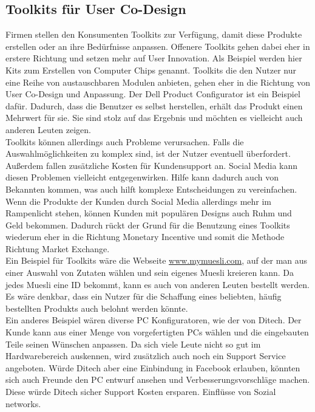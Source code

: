 \subsection{Toolkits f\"ur User Co-Design}
Firmen stellen den Konsumenten Toolkits zur Verf\"ugung, damit diese Produkte erstellen oder an ihre Bed\"urfnisse anpassen. Offenere Toolkits gehen dabei eher in erstere Richtung und setzen mehr auf User Innovation. Als Beispiel werden hier Kits zum Erstellen von Computer Chips genannt. Toolkits die den Nutzer nur eine Reihe von austauschbaren Modulen anbieten, gehen eher in die Richtung von User Co-Design und Anpassung. Der Dell Product Configurator ist ein Beispiel daf\"ur. Dadurch, dass die Benutzer es selbst herstellen, erh\"alt das Produkt einen Mehrwert f\"ur sie. Sie sind stolz auf das Ergebnis und m\"ochten es vielleicht auch anderen Leuten zeigen.\\
Toolkits k\"onnen allerdings auch Probleme verursachen. Falls die Auswahlm\"oglichkeiten zu komplex sind, ist der Nutzer eventuell \"uberfordert. Au\ss{}erdem fallen zus\"atzliche Kosten f\"ur Kundensupport an. Social Media kann diesen Problemen vielleicht entgegenwirken. Hilfe kann dadurch auch von Bekannten kommen, was auch hilft komplexe Entscheidungen zu vereinfachen.
Wenn die Produkte der Kunden durch Social Media allerdings mehr im Rampenlicht stehen, k\"onnen Kunden mit popul\"aren Designs auch Ruhm und Geld bekommen. Dadurch r\"uckt der Grund f\"ur die Benutzung eines Toolkits wiederum eher in die Richtung Monetary Incentive und somit die Methode Richtung Market Exchange.\\
Ein Beispiel f\"ur Toolkits w\"are die Webseite \url{www.mymuesli.com}, auf der man aus einer Auswahl von Zutaten w\"ahlen und sein eigenes Muesli kreieren kann. Da jedes Muesli eine ID bekommt, kann es auch von anderen Leuten bestellt werden. Es w\"are denkbar, dass ein Nutzer f\"ur die Schaffung eines beliebten, h\"aufig bestellten Produkts auch belohnt werden k\"onnte.\\
Ein anderes Beispiel w\"aren diverse PC Konfiguratoren, wie der von Ditech\cite{DITECH}. Der Kunde kann aus einer Menge von vorgefertigten PCs w\"ahlen und die eingebauten Teile seinen W\"unschen anpassen. Da sich viele Leute nicht so gut im Hardwarebereich auskennen, wird zus\"atzlich auch noch ein Support Service angeboten. W\"urde Ditech aber eine Einbindung in Facebook erlauben, k\"onnten sich auch Freunde den PC entwurf ansehen und Verbesserungsvorschl\"age machen. Diese w\"urde Ditech sicher Support Kosten ersparen.
Einfl\"usse von Sozial networks.

